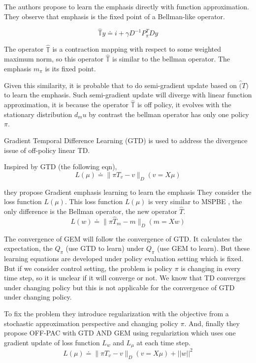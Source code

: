 The authors \cite{zhang2020provably} propose to learn the emphasis directly with function approximation.
They observe that emphasis is the fixed point of a Bellman-like operator. 

 \begin{equation}
    \hat{\mathbb{T}}y \doteq i + \gamma D^{-1}P^T_\pi Dy
 \end{equation}

The operator $\hat{\mathbb{T}}$ is a contraction mapping with respect to some weighted maximum norm, so this operator $\hat{\mathbb{T}}$ is similar to the bellman operator. The emphasis $m_\pi$ is its fixed point.

Given this similarity, it is probable that to do semi-gradient update based on $\hat(T)$ to learn the emphasis. Such semi-gradient update will diverge with linear function approximation, it is because the operator $\hat{\mathbb{T}}$ is off policy, it evolves with the stationary distribution $d_mu$ by contrast the bellman operator has only one policy $\pi$.

Gradient Temporal Difference Learning (GTD) is used to address the divergence issue of off-policy linear TD.

Inspired by GTD (the following eqn),
\begin{equation}
    L(\mu)\doteq \| \pi T_v -v \|_D(v=X\mu)
\end{equation}

they propose Gradient emphasis learning to learn the emphasis 
They consider the loss function $L(\mu)$. This loss function $L(\mu)$ is very similar to MSPBE , the only difference is the Bellman operator, the new operator $\hat{T}$.
\begin{equation}
    L(w)\doteq \| \pi \hat{T}_m - m \|_D(m=Xw)
\end{equation}

The convergence of GEM will follow the convergence of GTD. It calculates the expectation, the $Q_\pi$ (use GTD to learn) under $Q_\pi$ (use GEM to learn). But these learning equations are developed under policy evaluation setting which is fixed. But if we consider control setting, the problem is policy $\pi$ is changing in every time step, so it is unclear if it will converge or not. We know that TD converges under changing policy but this is not applicable for the convergence of GTD under changing policy.

To fix the problem they introduce regularization with the objective from a stochastic approximation perspective and changing policy $\pi$. And, finally they propose OFF-PAC with GTD AND GEM using regulariztion which uses one gradient update of loss function $L_w$ and $L_\mu$ at each time step.
\begin{equation}
    L(\mu)\doteq \| \pi T_v -v \|_D(v=X\mu) + ||w||^2
\end{equation}

